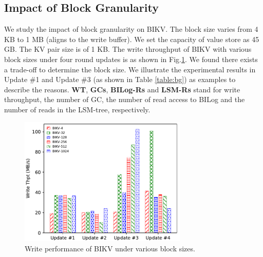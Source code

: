 \documentclass[sigconf]{acmart}
\begin{document}
\subsection{Impact of Block Granularity}
We study the impact of block granularity on BIKV. The block size varies from 4 KB to 1 MB (aligns to the write buffer). We set the capacity of value store as 45 GB. The KV pair size is of 1 KB. The write throughput of BIKV with various block sizes under four round updates is as shown in Fig.\ref{fig:bg}. We found there exists a trade-off to determine the block size. We illustrate the experimental results in Update \#1 and Update \#3 (as shown in Table \ref{table:bg}) as examples to describe the reasons. \textbf{WT}, \textbf{GCs}, \textbf{BILog-Rs} and \textbf{LSM-Rs} stand for write throughput, the number of GC, the number of read access to BILog and the number of reads in the LSM-tree, respectively.

\begin{figure}[t]
	\setlength{\abovecaptionskip}{0.cm}	
	\setlength{\belowcaptionskip}{-0.cm}
	\centering
	\includegraphics[width=80mm]{block_gra.pdf}
	\makeatletter\def\@captype{figure}\makeatother\caption{Write performance of BIKV under various block sizes.} 
	\label{fig:bg}			
\end{figure}
\end{document}
